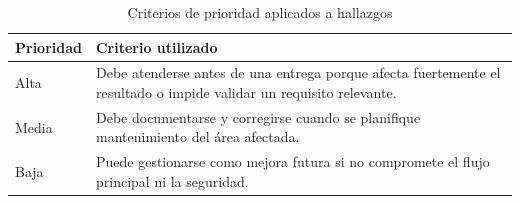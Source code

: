 \documentclass[11pt,spanish]{article}
\begin{document}
\begin{table}[H]
\centering
\caption{Criterios de prioridad aplicados a hallazgos}
\label{tab:anexo-prioridad}
\begin{tabularx}{\textwidth}{p{3cm} Y}
\toprule
\textbf{Prioridad} & \textbf{Criterio utilizado} \\
\midrule
Alta & Debe atenderse antes de una entrega porque afecta fuertemente el resultado o impide validar un requisito relevante. \\
Media & Debe documentarse y corregirse cuando se planifique mantenimiento del área afectada. \\
Baja & Puede gestionarse como mejora futura si no compromete el flujo principal ni la seguridad. \\
\bottomrule
\end{tabularx}
\end{table}
\end{document}
